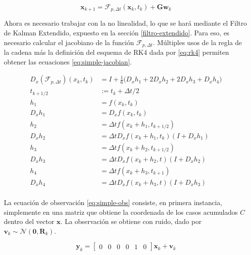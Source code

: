 \begin{equation} \label{eq:simple-estado-discreto}
\mathbf{x}_{k+1} = \mathcal{F}_{p, \Delta t}(\mathbf{x}_k, t_k) +  \mathbf{G}\mathbf{w}_{k} 
\end{equation}


Ahora es necesario trabajar con la no linealidad, lo que se hará mediante el Filtro de Kalman Extendido, expuesto en la sección \ref{filtro-extendido}. Para eso, es necesario calcular el jacobiano de la función \(\mathcal{F}_{p, \Delta t}\). Múltiples usos de la regla de la cadena más la definición del esquema de RK4 dada por \ref{eq:rk4} permiten obtener las ecuaciones \ref{eq:simple-jacobian}.

\begin{equation}\label{eq:simple-jacobian}
\begin{aligned}
D_x(\mathcal{F}_{p, \Delta t})(x_k, t_k) &= I + \frac{1}{6}\Big( D_x h_1  +  2 D_x h_2 + 2D_x h_3 +D_x h_4\Big) \\
t_{k + 1/2} &:= t_k + \Delta t / 2\\
h_1 &= f(x_k, t_k) \\
D_x h_1 &= D_x f(x_k, t_k)\\
h_2 &= \Delta t f(x_k + h_1, t_{k + 1/2}) \\
D_x h_2 &= \Delta t D_x f(x_k + h_1, t_k) (I + D_x h_1)  \\
h_3 &= \Delta t f(x_k + h_2, t_{k + 1/2}) \\
D_x h_3 &= \Delta t D_x f(x_k + h_2, t)(I + D_x h_2) \\
h_4 &= \Delta t f(x_k + h_3, t_{k + 1}) \\
D_x h_4 &= \Delta t D_x f(x_k + h_3, t)(I + D_x h_3) \\
\end{aligned}
\end{equation}


La ecuación de observación \ref{eq:simple-obs} consiste, en primera instancia, simplemente en una matriz que obtiene la coordenada de los casos acumulados \(C\) dentro del vector \(\mathbf{x}\). La observación se obtiene con ruido, dado por \(\mathbf{v}_{k} \sim \mathcal{N}(\mathbf{0}, \mathbf{R}_k)\). 


\begin{equation} \label{eq:simple-obs}
\mathbf{y}_{k} = 
\begin{bmatrix}0 & 0 & 0 & 0 & 1 & 0\end{bmatrix} \mathbf{x}_{k} + \mathbf{v}_k
\end{equation}

